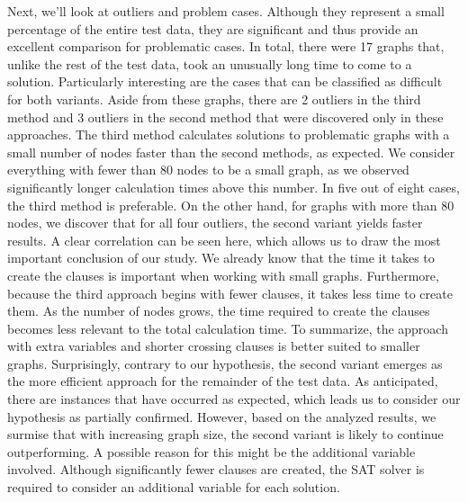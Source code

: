 \documentclass[bachelor, english]{algothesis}
\begin{document}
Next, we'll look at outliers and problem cases. Although they represent a small percentage of the entire test data, they are significant and thus provide an excellent comparison for problematic cases. In total, there were 17 graphs that, unlike the rest of the test data, took an unusually long time to come to a solution. Particularly interesting are the cases that can be classified as difficult for both variants.  Aside from these graphs, there are 2 outliers in the third method and 3 outliers in the second method that were discovered only in these approaches. The third method calculates solutions to problematic graphs with a small number of nodes faster than the second methods, as expected. We consider everything with fewer than 80 nodes to be a small graph, as we observed significantly longer calculation times above this number. In five out of eight cases, the third method is preferable. On the other hand, for graphs with more than 80 nodes, we discover that for all four outliers, the second variant yields faster results. 
\newline
A clear correlation can be seen here, which allows us to draw the most important conclusion of our study. We already know that the time it takes to create the clauses is important when working with small graphs. Furthermore, because the third approach begins with fewer clauses, it takes less time to create them. As the number of nodes grows, the time required to create the clauses becomes less relevant to the total calculation time. To summarize, the approach with extra variables and shorter crossing clauses is better suited to smaller graphs. Surprisingly, contrary to our hypothesis, the second variant emerges as the more efficient approach for the remainder of the test data. As anticipated, there are instances that have occurred as expected, which leads us to consider our hypothesis as partially confirmed. However, based on the analyzed results, we surmise that with increasing graph size, the second variant is likely to continue outperforming. A possible reason for this might be the additional variable involved. Although significantly fewer clauses are created, the SAT solver is required to consider an additional variable for each solution.
\end{document}
